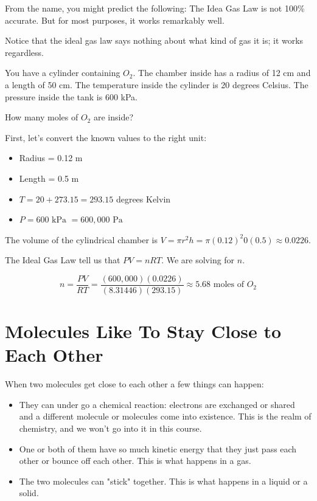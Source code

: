 From the name,  you might predict the following: The Idea Gas Law is not 100\% accurate.   But for most purposes,  it works remarkably well.  

Notice that the ideal gas law says nothing about what kind of gas it is; it works regardless.

\begin{Exercise}[title={Ideal Gas Law},  label=ideal_gas]
  
You have a cylinder containing $O_2$.  The chamber inside has a radius of 12 cm and a length of 50 cm.  
The temperature inside the cylinder is 20 degrees Celsius.
The pressure inside the tank is 600 kPa.

How many moles of $O_2$ are inside?

\end{Exercise}
\begin{Answer}[ref=ideal_gas]

First, let's convert the known values to the right unit:
\begin{itemize}
\item Radius = 0.12 m
\item Length = 0.5 m
\item $T = 20 + 273.15 = 293.15$ degrees Kelvin
\item $P = 600 \text{ kPa } = 600,000 \text{ Pa }$
\end{itemize}

The volume of the cylindrical chamber is $V = \pi r^2 h = \pi (0.12)^2 0 (0.5) \approx 0.0226$.

The Ideal Gas Law tell us that $PV = nRT$.  We are solving for $n$.

$$n = \frac{PV}{RT} = \frac{(600,000)(0.0226)}{(8.31446)(293.15)} \approx 5.68 \text{ moles of } O_2$$

\end{Answer}

\section{Molecules Like To Stay Close to Each Other}

When two molecules get close to each other a few things can happen:
\begin{itemize}  
\item They can under go a chemical reaction: electrons are exchanged or shared and a different molecule or molecules come into existence.  
This is the realm of chemistry, and we won't go into it in this course.
\item One or both of them have so much kinetic energy that they just pass each other or bounce off each other.  This is what happens in a gas.
\item The two molecules can "stick" together.  This is what happens in a liquid or a solid.
\end{itemize}

